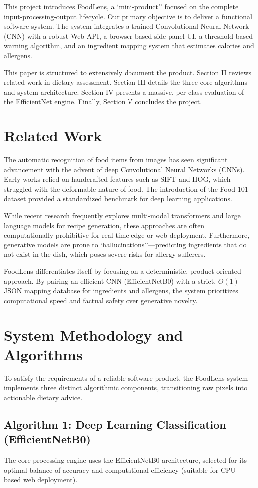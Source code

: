 \documentclass[conference]{IEEEtran}
\begin{document}
This project introduces FoodLens, a `mini-product'' focused on the complete input-processing-output lifecycle. Our primary objective is to deliver a functional software system. The system integrates a trained Convolutional Neural Network (CNN) with a robust Web API, a browser-based side panel UI, a threshold-based warning algorithm, and an ingredient mapping system that estimates calories and allergens.

This paper is structured to extensively document the product. Section II reviews related work in dietary assessment. Section III details the three core algorithms and system architecture. Section IV presents a massive, per-class evaluation of the EfficientNet engine. Finally, Section V concludes the project.

\section{Related Work}
The automatic recognition of food items from images has seen significant advancement with the advent of deep Convolutional Neural Networks (CNNs). Early works relied on handcrafted features such as SIFT and HOG, which struggled with the deformable nature of food. The introduction of the Food-101 dataset provided a standardized benchmark for deep learning applications.

While recent research frequently explores multi-modal transformers and large language models for recipe generation, these approaches are often computationally prohibitive for real-time edge or web deployment. Furthermore, generative models are prone to `hallucinations''---predicting ingredients that do not exist in the dish, which poses severe risks for allergy sufferers.

FoodLens differentiates itself by focusing on a deterministic, product-oriented approach. By pairing an efficient CNN (EfficientNetB0) with a strict, $O(1)$ JSON mapping database for ingredients and allergens, the system prioritizes computational speed and factual safety over generative novelty.

\section{System Methodology and Algorithms}
To satisfy the requirements of a reliable software product, the FoodLens system implements three distinct algorithmic components, transitioning raw pixels into actionable dietary advice.

\subsection{Algorithm 1: Deep Learning Classification (EfficientNetB0)}
The core processing engine uses the EfficientNetB0 architecture, selected for its optimal balance of accuracy and computational efficiency (suitable for CPU-based web deployment). 
\end{document}

